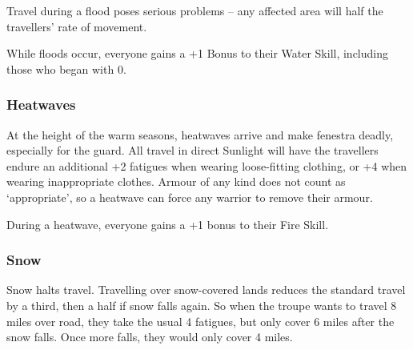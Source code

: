 \begin{multicols}{2}
Travel during a flood poses serious problems -- any affected area will half the travellers' rate of movement.

While floods occur, everyone gains a +1 Bonus to their Water Skill, including those who began with 0.

\subsubsection{Heatwaves}

At the height of the warm seasons, heatwaves arrive and make \gls{fenestra} deadly, especially for the \gls{guard}.
All travel in direct Sunlight will have the travellers endure an additional +2 \glspl{fatigue} when wearing loose-fitting clothing, or +4 when wearing inappropriate clothes.
Armour of any kind does not count as `appropriate', so a heatwave can force any warrior to remove their armour.

During a heatwave, everyone gains a +1 bonus to their Fire Skill.

\subsubsection{Snow}

Snow halts travel.
Travelling over snow-covered lands reduces the standard travel by a third, then a half if snow falls again.
So when the troupe wants to travel 8 miles over road, they take the usual 4 \glspl{fatigue}, but only cover 6 miles after the snow falls.
Once more falls, they would only cover 4 miles.




\end{multicols}

\setcounter{diceNo}{13}
\setcounter{diceNo2}{15}
\setcounter{enc}{17}

